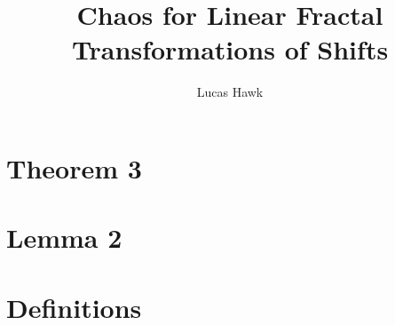 \documentclass{article}
\title{Chaos for Linear Fractal Transformations of Shifts}
\author{Lucas Hawk}
\theoremstyle{plain}
\theoremstyle{definition}
\begin{document}
\maketitle

\setcounter{theorem}{2}
\section{Theorem 3}


\setcounter{lemma}{1}
\section{Lemma 2}


\section{Definitions}

\end{document}
